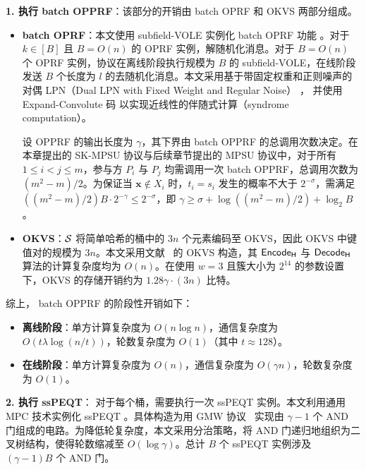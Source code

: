 \begin{trivlist}
\item \textbf{1. 执行 batch OPPRF}：该部分的开销由 batch OPRF 和 OKVS 两部分组成。
\begin{itemize}
    \item \textbf{batch OPRF}：本文使用 subfield-VOLE 实例化 batch OPRF 功能 \cite{BuiC23}。对于 $k \in [B]$ 且 $B = O(n)$ 的 OPRF 实例，解随机化消息。对于 $B = O(n)$ 个 OPRF 实例，协议在离线阶段执行规模为 $B$ 的 subfield-VOLE，在线阶段发送 $B$ 个长度为 $l$ 的去随机化消息。本文采用基于带固定权重和正则噪声的对偶 LPN（Dual LPN with Fixed Weight and Regular Noise） \cite{BCGIKRS19,BCGIKS19}， 并使用 Expand-Convolute 码 \cite{RRT23} 以实现近线性的伴随式计算（syndrome computation）。
    
    设 OPPRF 的输出长度为 $\gamma$，其下界由 batch OPPRF 的总调用次数决定。在本章提出的 SK-MPSU 协议与后续章节提出的 MPSU 协议中，对于所有 $1 \le i < j \le m$，参与方 $P_i$ 与 $P_j$ 均需调用一次 batch OPPRF，总调用次数为 $(m^2 - m) / 2$。为保证当 $\textbf{x} \notin X_i$ 时，$t_i = s_i$ 发生的概率不大于 $2^{-\sigma}$，需满足 $((m^2 - m) / 2) B \cdot 2^{-\gamma} \le 2^{-\sigma}$，即 $\gamma \ge \sigma + \log((m^2 - m) / 2) + \log_2 B$。

    \item \textbf{OKVS}：$\mathcal{S}$ 将简单哈希的桶中的 $3n$ 个元素编码至 OKVS，因此 OKVS 中键值对的规模为 $3n$。本文采用文献~\cite{RR-CCS-2022} 的 OKVS 构造，其 $\mathsf{Encode_H}$ 与 $\mathsf{Decode_H}$ 算法的计算复杂度均为 $O(n)$。在使用 $w=3$ 且簇大小为 $2^{14}$ 的参数设置下，OKVS 的存储开销约为 $1.28 \gamma \cdot (3n)$ 比特。
\end{itemize}

综上， batch OPPRF 的阶段性开销如下：
\begin{itemize}
    \item \textbf{离线阶段}：单方计算复杂度为 $O(n \log n)$，通信复杂度为 $O(t \lambda \log (n / t))$，轮数复杂度为 $O(1)$（其中 $t \approx 128$）。
    \item \textbf{在线阶段}：单方计算复杂度为 $O(n)$，通信复杂度为 $O(\gamma n)$，轮数复杂度为 $O(1)$。
\end{itemize}

\item \textbf{2. 执行 ssPEQT}：
对于每个桶，需要执行一次 ssPEQT 实例。本文利用通用 MPC 技术实例化 ssPEQT \cite{PSTY-EUROCRYPT-2019}。具体构造为用 GMW 协议~\cite{GMW-STOC-1987} 实现由 $\gamma-1$ 个 AND 门组成的电路。为降低轮复杂度，本文采用分治策略，将 AND 门递归地组织为二叉树结构，使得轮数缩减至 $O(\log \gamma)$。总计 $B$ 个 ssPEQT 实例涉及 $(\gamma-1)B$ 个 AND 门。


\end{trivlist}

